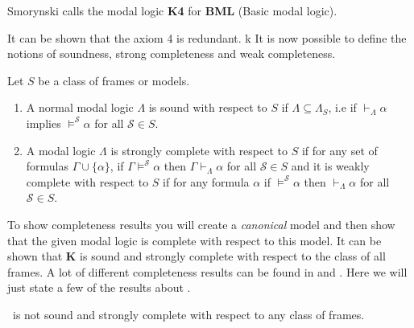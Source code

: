 \documentclass[../main.tex]{subfiles}
\begin{document}
\begin{remark}
	Smorynski calls the modal logic \textbf{K4} for \textbf{BML} (Basic modal
logic).
\end{remark}


It can be shown that the axiom 4 is redundant. k
It is now possible to define the notions of soundness, strong completeness and
weak completeness.
\begin{defi}
	Let $S$ be a class of frames or models.
	\begin{enumerate}
		\item A normal modal logic $\Lambda$ is sound with respect to $S$ if
		$\Lambda\subseteq\Lambda_S$, i.e if $\vdash_\Lambda\alpha$
		implies $\vDash^\mathcal{S}\alpha$ for all $\mathcal{S}\in S$.
	\item A modal logic $\Lambda$ is strongly complete with respect to $S$
		if for any set of formulas $\Gamma\cup\{\alpha\}$, if
		$\Gamma\vDash^\mathcal{S}\alpha$ then
		$\Gamma\vdash_\Lambda\alpha$ for all $\mathcal{S}\in S$ and it
		is weakly complete with respect to $S$ if for any formula
		$\alpha$ if $\vDash^\mathcal{S}\alpha$ then
		$\vdash_\Lambda\alpha$ for all $\mathcal{S}\in S$.
	\end{enumerate}
\end{defi}
To show completeness results you will create a \textit{canonical} model and
then show that the given modal logic is complete with respect to this model. It
can be shown that \textbf{K} is sound and strongly complete with respect to the
class of all frames. A lot of different completeness results can be found in
\parencite{Lemmon1977} and \cite{Blackburn2002}. Here we will just state a few of
the results about \GL.

\begin{thm}
	\GL\ is not sound and strongly complete with respect to any class of
	frames.
\end{thm}
\end{document}
